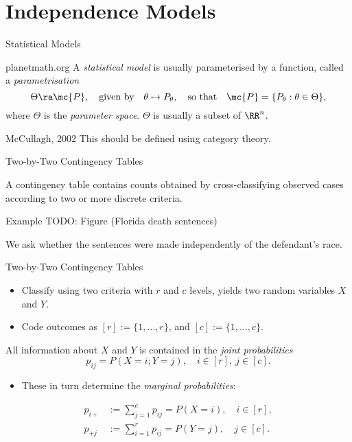 \section{Independence Models}

\begin{frame}{Statistical Models}
    \begin{block}{planetmath.org}
    A \emph{statistical model} is usually parameterised by a function, called a \emph{parametrisation}
    $$ \Theta \ra \mc{P}, \quad \text{given by} \quad \theta \mapsto P_{\theta},\quad \text{so that}\quad \mc{P} = \{ P_{\theta} : \theta \in \Theta \}, $$
    where $\Theta$ is the \emph{parameter space}. $\Theta$ is usually a subset of $\RR^{n}$.
    \end{block}

    \begin{block}{McCullagh, 2002}
    This should be defined using category theory.
    \end{block}
\end{frame}

\begin{frame}{Two-by-Two Contingency Tables}
    
    A contingency table contains counts obtained by cross-classifying observed cases according to two or more discrete criteria.

    \begin{block}{Example}
        TODO: Figure (Florida death sentences)
    \end{block}

    We ask whether the sentences were made independently of the defendant's race.
\end{frame}

\begin{frame}{Two-by-Two Contingency Tables}
    
    \begin{itemize}
        \item Classify using two criteria with $r$ and $c$ levels, yields two random variables $X$ and $Y$. 
        \item Code outcomes as $[r] := \{1,\ldots, r\}$, and $[c] := \{ 1, \ldots, c \}$.
    \end{itemize}
    
    All information about $X$ and $Y$ is contained in the \emph{joint probabilities}
    $$ p_{ij} = P(X = i; Y = j), \quad i \in [r],\ j \in [c]. $$

    \begin{itemize}
        \item These in turn determine the \emph{marginal probabilities}:
    \end{itemize}

    \begin{equation*}
        \begin{split}
            p_{i+} &:= \sum_{j = 1}^{c} p_{ij} = P(X = i), \quad i \in [r], \\
            p_{+j} &:= \sum_{i = 1}^{r} p_{ij} = P(Y = j), \quad j \in [c].
        \end{split}
    \end{equation*}

\end{frame}

